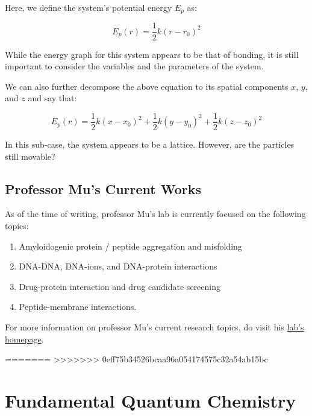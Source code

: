 \documentclass[
  letterpaper,
  DIV=11,
  numbers=noendperiod]{scrreprt}
\providecommand{\tightlist}{%
  \setlength{\itemsep}{0pt}\setlength{\parskip}{0pt}}\usepackage{longtable,booktabs,array}
\begin{document}
Here, we define the system's potential energy \(E_p\) as:

\begin{equation}
  E_p(r) = \frac{1}{2}k(r - r_0)^2
\end{equation}

While the energy graph for this system appears to be that of bonding, it
is still important to consider the variables and the parameters of the
system.

We can also further decompose the above equation to its spatial
components \(x\), \(y\), and \(z\) and say that:

\begin{equation}
E_p(r) = \frac{1}{2}k(x - x_0)^2 + \frac{1}{2}k(y - y_0)^2 + \frac{1}{2}k(z - z_0)^2
\end{equation}

In this sub-case, the system appears to be a lattice. However, are the
particles still movable?

\hypertarget{professor-mus-current-works}{%
\section{Professor Mu's Current
Works}\label{professor-mus-current-works}}

As of the time of writing, professor Mu's lab is currently focused on
the following topics:

\begin{enumerate}
\def\labelenumi{\arabic{enumi}.}
\tightlist
\item
  Amyloidogenic protein / peptide aggregation and misfolding
\item
  DNA-DNA, DNA-ions, and DNA-protein interactions
\item
  Drug-protein interaction and drug candidate screening
\item
  Peptide-membrane interactions.
\end{enumerate}

For more information on professor Mu's current research topics, do visit
his
\href{https://www.ntu.edu.sg/sbs/research/research-directory/Mu-Yuguang}{lab's
homepage}.

=======
>>>>>>> 0eff75b34526bcaa96a054174575c32a54ab15bc
\hypertarget{fundamental-quantum-chemistry}{%
\chapter{Fundamental Quantum
Chemistry}\label{fundamental-quantum-chemistry}}
\end{document}
